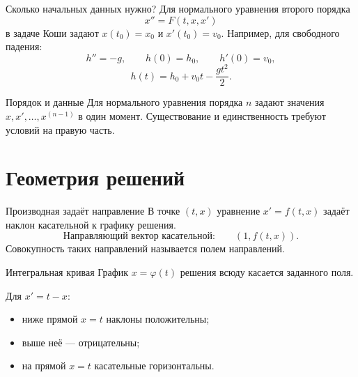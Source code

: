 \documentclass[aspectratio=169,11pt]{beamer}
\begin{document}
\begin{frame}{Сколько начальных данных нужно?}
  Для нормального уравнения второго порядка
  \[
    x''=F(t,x,x')
  \]
  в задаче Коши задают $x(t_0)=x_0$ и $x'(t_0)=v_0$.
  Например, для свободного падения:
  \[
    h''=-g,\qquad h(0)=h_0,\qquad h'(0)=v_0,
  \]
  \[
    h(t)=h_0+v_0t-\frac{gt^2}{2}.
  \]
  \begin{block}{Порядок и данные}
    Для нормального уравнения порядка $n$ задают значения
    $x,x',\ldots,x^{(n-1)}$ в один момент.
    Существование и единственность требуют условий на правую часть.
  \end{block}
\end{frame}

\section{Геометрия решений}
\begin{frame}{Производная задаёт направление}
  В точке $(t,x)$ уравнение $x'=f(t,x)$ задаёт наклон касательной
  к графику решения.
  \[
    \text{Направляющий вектор касательной:}\qquad (1,f(t,x)).
  \]
  Совокупность таких направлений называется \alert{полем направлений}.
  \begin{block}{Интегральная кривая}
    График $x=\varphi(t)$ решения всюду касается заданного поля.
  \end{block}
  Для $x'=t-x$:
  \begin{itemize}
    \item ниже прямой $x=t$ наклоны положительны;
    \item выше неё --- отрицательны;
    \item на прямой $x=t$ касательные горизонтальны.
  \end{itemize}
\end{frame}
\end{document}
